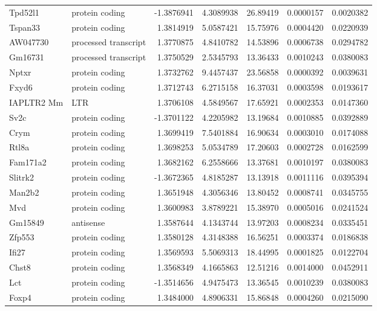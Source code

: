 \documentclass[onehalf,12pt]{beavtex}
\begin{document}
\begin{longtable}{llrrrrr}
  \addlinespace
  Tpd52l1 & protein coding & -1.3876941 & 4.3089938 & 26.89419 & 0.0000157 & 0.0020382\\
  Tspan33 & protein coding & 1.3814919 & 5.0587421 & 15.75976 & 0.0004420 & 0.0220939\\
  AW047730 & processed transcript & 1.3770875 & 4.8410782 & 14.53896 & 0.0006738 & 0.0294782\\
  Gm16731 & processed transcript & 1.3750529 & 2.5345793 & 13.36433 & 0.0010243 & 0.0380083\\
  Nptxr & protein coding & 1.3732762 & 9.4457437 & 23.56858 & 0.0000392 & 0.0039631\\
  \addlinespace
  Fxyd6 & protein coding & 1.3712743 & 6.2715158 & 16.37031 & 0.0003598 & 0.0193617\\
  IAPLTR2 Mm & LTR & 1.3706108 & 4.5849567 & 17.65921 & 0.0002353 & 0.0147360\\
  Sv2c & protein coding & -1.3701122 & 4.2205982 & 13.19684 & 0.0010885 & 0.0392889\\
  Crym & protein coding & 1.3699419 & 7.5401884 & 16.90634 & 0.0003010 & 0.0174088\\
  Rtl8a & protein coding & 1.3698253 & 5.0534789 & 17.20603 & 0.0002728 & 0.0162599\\
  \addlinespace
  Fam171a2 & protein coding & 1.3682162 & 6.2558666 & 13.37681 & 0.0010197 & 0.0380083\\
  Slitrk2 & protein coding & -1.3672365 & 4.8185287 & 13.13918 & 0.0011116 & 0.0395394\\
  Man2b2 & protein coding & 1.3651948 & 4.3056346 & 13.80452 & 0.0008741 & 0.0345755\\
  Mvd & protein coding & 1.3600983 & 3.8789221 & 15.38970 & 0.0005016 & 0.0241524\\
  Gm15849 & antisense & 1.3587644 & 4.1343744 & 13.97203 & 0.0008234 & 0.0335451\\
  \addlinespace
  Zfp553 & protein coding & 1.3580128 & 4.3148388 & 16.56251 & 0.0003374 & 0.0186838\\
  Ifi27 & protein coding & 1.3569593 & 5.5069313 & 18.44995 & 0.0001825 & 0.0122704\\
  Chst8 & protein coding & 1.3568349 & 4.1665863 & 12.51216 & 0.0014000 & 0.0452911\\
  Lct & protein coding & -1.3514656 & 4.9475473 & 13.36545 & 0.0010239 & 0.0380083\\
  Foxp4 & protein coding & 1.3484000 & 4.8906331 & 15.86848 & 0.0004260 & 0.0215090\\

\end{longtable}
\end{document}
